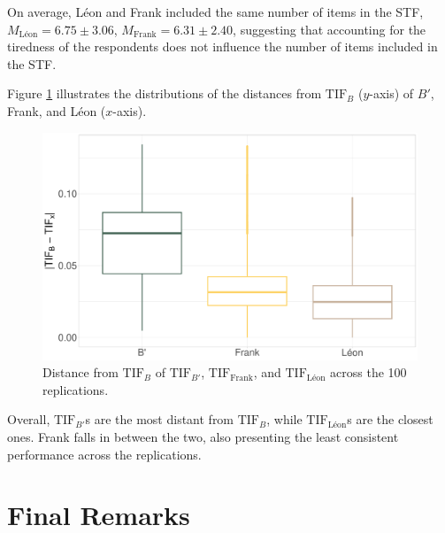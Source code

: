 \documentclass{svproc}
\begin{document}
On average, Léon and Frank included the same number of items in the STF, $M_{\text{Léon}} = 6.75 \pm 3.06$, $M_{\text{Frank}} = 6.31 \pm 2.40$, suggesting that accounting for the tiredness of the respondents does not influence the number of items included in the STF.

Figure \ref{fig:points-alogirthms} illustrates the distributions of the distances from $\text{TIF}_B$ ($y$-axis) of $B'$, Frank, and Léon ($x$-axis).

\begin{figure}[!h]
	\centering
	\includegraphics[width=\linewidth]{img/box-plot-alogirthms}
	\caption{Distance from $\text{TIF}_{B}$ of $\text{TIF}_{B'}$, $\text{TIF}_{\text{Frank}}$, and $\text{TIF}_{\text{Léon}}$  across the 100 replications.} 
	\label{fig:points-alogirthms}
\end{figure}

Overall, $\text{TIF}_{B'}$s are the most distant from $\text{TIF}_B$, while $\text{TIF}_{\text{Léon}}$s are the closest ones. Frank falls in between the two, also presenting the least consistent performance across the replications. 

\section{Final Remarks}
\end{document}
